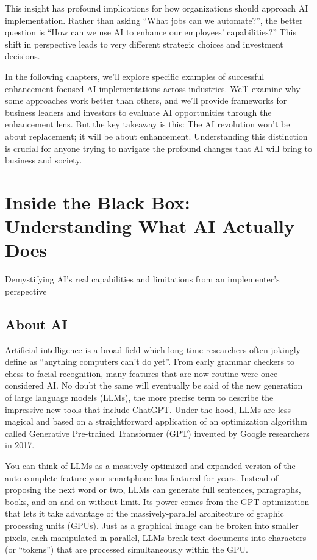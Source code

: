 \documentclass[
  Letterpaper,
]{scrbook}
\begin{document}
This insight has profound implications for how organizations should
approach AI implementation. Rather than asking ``What jobs can we
automate?'', the better question is ``How can we use AI to enhance our
employees' capabilities?'' This shift in perspective leads to very
different strategic choices and investment decisions.

In the following chapters, we'll explore specific examples of successful
enhancement-focused AI implementations across industries. We'll examine
why some approaches work better than others, and we'll provide
frameworks for business leaders and investors to evaluate AI
opportunities through the enhancement lens. But the key takeaway is
this: The AI revolution won't be about replacement; it will be about
enhancement. Understanding this distinction is crucial for anyone trying
to navigate the profound changes that AI will bring to business and
society.


\chapter{Inside the Black Box: Understanding What AI Actually
Does}\label{inside-the-black-box-understanding-what-ai-actually-does}

Demystifying AI's real capabilities and limitations from an
implementer's perspective

\section{About AI}\label{about-ai}

Artificial intelligence is a broad field which long-time researchers
often jokingly define as ``anything computers can't do yet''. From early
grammar checkers to chess to facial recognition, many features that are
now routine were once considered AI. No doubt the same will eventually
be said of the new generation of large language models (LLMs), the more
precise term to describe the impressive new tools that include ChatGPT.
Under the hood, LLMs are less magical and based on a straightforward
application of an optimization algorithm called Generative Pre-trained
Transformer (GPT) invented by Google researchers in 2017.

You can think of LLMs as a massively optimized and expanded version of
the auto-complete feature your smartphone has featured for years.
Instead of proposing the next word or two, LLMs can generate full
sentences, paragraphs, books, and on and on without limit. Its power
comes from the GPT optimization that lets it take advantage of the
massively-parallel architecture of graphic processing units (GPUs). Just
as a graphical image can be broken into smaller pixels, each manipulated
in parallel, LLMs break text documents into characters (or ``tokens'')
that are processed simultaneously within the GPU.
\end{document}
